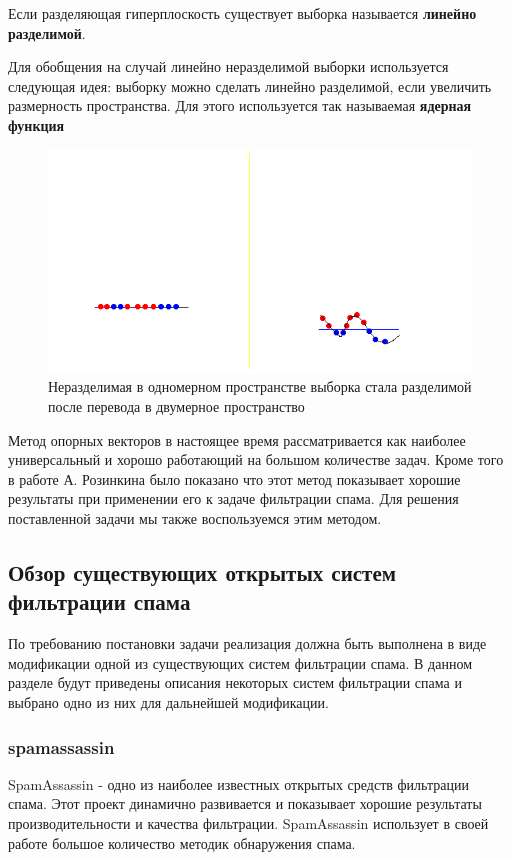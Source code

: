 Если разделяющая гиперплоскость существует выборка называется \textbf{линейно разделимой}.

Для обобщения на случай линейно неразделимой выборки используется следующая идея: выборку можно сделать линейно разделимой, если увеличить размерность пространства. Для этого используется так называемая \textbf{ядерная функция}

\begin{figure}[h]
\begin{center}
\includegraphics[width=15cm]{img/svm2}
\end{center}
\caption{Неразделимая в одномерном пространстве выборка стала разделимой после перевода в двумерное пространство}
\label{svm-kernel}
\end{figure}

Метод опорных векторов в настоящее время рассматривается как наиболее универсальный и хорошо работающий на большом количестве задач. Кроме того в работе А. Розинкина было показано что этот метод показывает хорошие результаты при применении его к задаче фильтрации спама. Для решения поставленной задачи мы также воспользуемся этим методом.

\subsection{Обзор существующих открытых систем фильтрации спама}
По требованию постановки задачи реализация должна быть выполнена в виде модификации одной из существующих систем фильтрации спама. В данном разделе будут приведены описания некоторых систем фильтрации спама и выбрано одно из них для дальнейшей модификации.
\subsubsection{spamassassin}
SpamAssassin - одно из наиболее известных открытых средств фильтрации спама. Этот проект динамично развивается и показывает хорошие результаты производительности и качества фильтрации. SpamAssassin использует в своей работе большое количество методик обнаружения спама.
